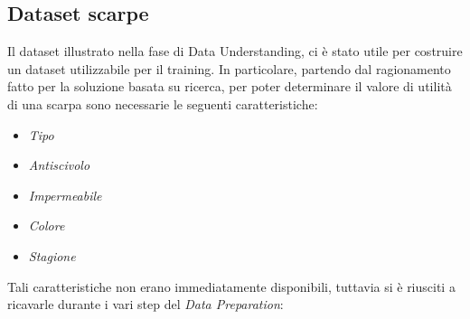 \documentclass[a4paper, 11pt, oneside]{report}
\begin{document}
                \subsection{Dataset scarpe}
                Il dataset illustrato nella fase di Data Understanding, ci è stato utile per costruire un dataset utilizzabile per il training.
                In particolare, partendo dal ragionamento fatto per la soluzione basata su ricerca, per poter determinare il valore di utilità
                di una scarpa sono necessarie le seguenti caratteristiche:
                \begin{itemize}
                    \item \emph{Tipo}
                    \item \emph{Antiscivolo}
                    \item \emph{Impermeabile}
                    \item \emph{Colore}
                    \item \emph{Stagione}
                \end{itemize}
                Tali caratteristiche non erano immediatamente disponibili, tuttavia si è riusciti a ricavarle durante
                i vari step del  \emph{Data Preparation}:
\end{document}
